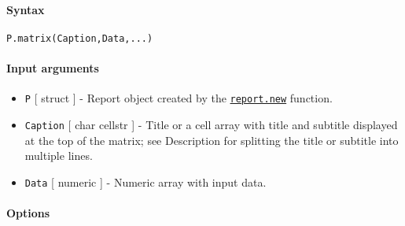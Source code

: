 


	\paragraph{Syntax}

\begin{verbatim}
P.matrix(Caption,Data,...)
\end{verbatim}

\paragraph{Input arguments}

\begin{itemize}
\item
  \texttt{P} {[} struct {]} - Report object created by the
  \href{report/new}{\texttt{report.new}} function.
\item
  \texttt{Caption} {[} char \textbar{} cellstr {]} - Title or a cell
  array with title and subtitle displayed at the top of the matrix; see
  Description for splitting the title or subtitle into multiple lines.
\item
  \texttt{Data} {[} numeric {]} - Numeric array with input data.
\end{itemize}

\paragraph{Options}

